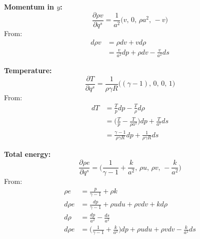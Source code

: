 \documentclass{article}
\begin{document}
\textbf{Momentum in $y$:}
\begin{equation*}
    \frac{\partial \rho v}{\partial q^s} = \frac{1}{a^2} \big( v,\, 0,\, \rho a^2,\, -v \big)
\end{equation*}
From:
\begin{equation*}
    \begin{split}
        d\rho v & = \rho dv + vd\rho \\
                & = \frac{v}{a^2}dp + \rho dv - \frac{v}{a^2}ds
    \end{split}
\end{equation*}

\textbf{Temperature:}
\begin{equation*}
    \frac{\partial T}{\partial q^s} = \frac{1}{\rho \gamma R} \big( (\gamma-1),\, 0,\, 0,\, 1 \big)
\end{equation*}
From:
\begin{equation*}
    \begin{split}
        dT & = \frac{T}{p}dp - \frac{T}{\rho}d\rho \\
           & = \big( \frac{T}{p} - \frac{T}{\rho a^2} \big)dp + \frac{T}{a^2}ds \\
           & = \frac{\gamma-1}{\rho \gamma R}dp + \frac{1}{\rho \gamma R}ds
    \end{split}
\end{equation*}

\textbf{Total energy:}
\begin{equation*}
    \frac{\partial \rho e}{\partial q^s} = \big( \frac{1}{\gamma-1} + \frac{k}{a^2},\, \rho u,\, \rho v,\, -\frac{k}{a^2} \big)
\end{equation*}
From:
\begin{equation*}
    \begin{split}
        \rho e  & = \frac{p}{\gamma-1} + \rho k \\
        d\rho e & = \frac{dp}{\gamma-1} + \rho u du + \rho v dv + kd\rho \\
        d\rho   & = \frac{dp}{a^2} - \frac{ds}{a^2} \\
        d\rho e & = \big(\frac{1}{\gamma-1} + \frac{k}{a^2}\big)dp + \rho u du + \rho v dv - \frac{k}{a^2}ds
    \end{split}
\end{equation*}
\end{document}

